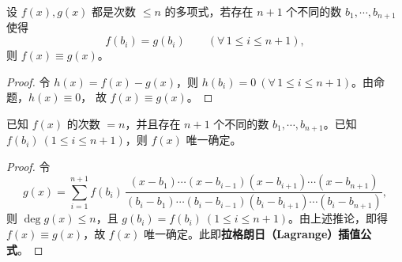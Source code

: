 \begin{corollary}
设 $f(x),g(x)$ 都是次数 $\le n$ 的多项式，若存在 $n+1$ 个不同的数 $b_1,\cdots,b_{n+1}$ 使得
\[
f(b_i)=g(b_i)\qquad(\forall\,1\le i\le n+1),
\]
则 $f(x)\equiv g(x)$。
\end{corollary}

\begin{proof}
令 $h(x)=f(x)-g(x)$，则 $h(b_i)=0\ (\forall\,1\le i\le n+1)$。由命题，$h(x)\equiv 0$，
故 \mbox{$f(x)\equiv g(x)$}。
\end{proof}

\begin{corollary}
已知 $f(x)$ 的次数 $=n$，并且存在 $n+1$ 个不同的数 $b_1,\cdots,b_{n+1}$。已知
$f(b_i)\ (1\le i\le n+1)$，则 $f(x)$ 唯一确定。
\end{corollary}

\begin{proof}
令
\[
g(x)=\sum_{i=1}^{n+1}f(b_i)\,
\frac{(x-b_1)\cdots(x-b_{i-1})(x-b_{i+1})\cdots(x-b_{n+1})}
{(b_i-b_1)\cdots(b_i-b_{i-1})(b_i-b_{i+1})\cdots(b_i-b_{n+1})},
\]
则 $\deg g(x)\le n$，且 $g(b_i)=f(b_i)\ (1\le i\le n+1)$。由上述推论，即得
$f(x)\equiv g(x)$，故 $f(x)$ 唯一确定。此即\textbf{拉格朗日（Lagrange）插值公式}。
\end{proof}
